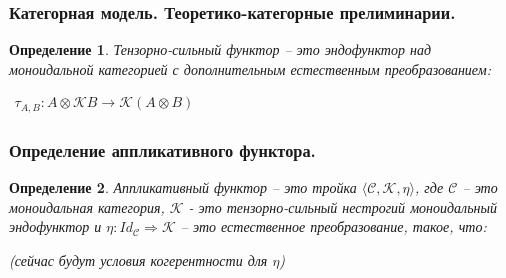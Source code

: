 \documentclass[10pt,pdf,utf8,russian,aspectratio=169]{beamer}
\newtheorem{defin}{Определение}
\begin{document}
\begin{frame}
  \frametitle{Категорная модель. Теоретико-категорные прелиминарии.}

  \begin{defin}

  Тензорно-сильный функтор -- это эндофунктор над моноидальной категорией с дополнительным естественным преобразованием:

  \begin{center}
  $\begin{array}{lll}
    \tau_{A, B} : A \otimes \mathcal{K}B \rightarrow \mathcal{K}(A \otimes B)
  \end{array}$
  \end{center}

  \end{defin}
\end{frame}

\begin{frame}
  \frametitle{Определение аппликативного функтора.}

  \begin{defin}
    Аппликативный функтор -- это тройка $\langle \mathcal{C}, \mathcal{K}, \eta \rangle$,
  где $\mathcal{C}$ -- это моноидальная категория, $\mathcal{K}$ - это тензорно-сильный нестрогий моноидальный эндофунктор и
  $\eta : Id_{\mathcal{C}} \Rightarrow \mathcal{K}$ -- это естественное преобразование, такое, что:

  (сейчас будут условия когерентности для $\eta$)
  \end{defin}
\end{frame}
\end{document}
